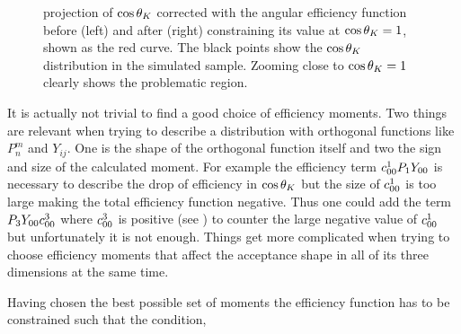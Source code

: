 \begin{figure}[t]
  \centering
  \begin{subfigure}{0.5\textwidth}
    \raggedright
    \scalebox{1.15}{}
    \caption{}
    \label{angAcc_nom}
  \end{subfigure}%
  \hfill%
  \begin{subfigure}{0.5\textwidth}
    \raggedleft
    \scalebox{1.15}{}
    \caption{}
    \label{angAcc_constr_fit}
  \end{subfigure}
  \caption{\pdf projection of $\cos\theta_{K}$ corrected with the angular efficiency function before (left) and after (right)
           constraining its value at $\cos\theta_{K}=1$, shown as the red curve. The black points show the $\cos\theta_{K}$
           distribution in the simulated sample. Zooming close to $\cos\theta_{K}=1$ clearly shows the problematic region.}
  \label{angAcc_constr}
\end{figure}

It is actually not trivial to find a good choice of efficiency moments. Two things are relevant when trying to describe a
distribution with orthogonal functions like $P_n^m$ and $Y_{ij}$. One is the shape of the orthogonal function itself and two the sign and size of the calculated moment.
For example the efficiency term $c^{1}_{00} P_1Y_{00}$ is necessary to describe the drop of efficiency in $\cos\theta_{K}$ but the size of $c^{1}_{00}$
is too large making the total efficiency function negative. Thus one could add the term $P_3Y_{00}c^{3}_{00}$ where $c^{3}_{00}$ is positive
(see  ) to counter the large negative value of $c^{1}_{00}$ but unfortunately it is not enough. Things get more complicated
when trying to choose efficiency moments that affect the acceptance shape in all of its three dimensions at the same time.

Having chosen the best possible set of moments the efficiency function has to be constrained such that the condition,

